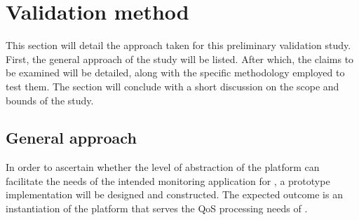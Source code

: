 
	
\section{Validation method}
\label{sec:val:method}
This section will detail the approach taken for this preliminary validation study. First, the general approach of the study will be listed. After which, the claims to be examined will be detailed, along with the specific methodology employed to test them. The section will conclude with a short discussion on the scope and bounds of the study.
\subsection{General approach}
In order to ascertain whether the level of abstraction of the platform can facilitate the needs of the intended monitoring application for \sensitnospace, a prototype implementation will be designed and constructed. The expected outcome is an instantiation of the platform that serves the QoS processing needs of \nedap\idsystemsnospace.

